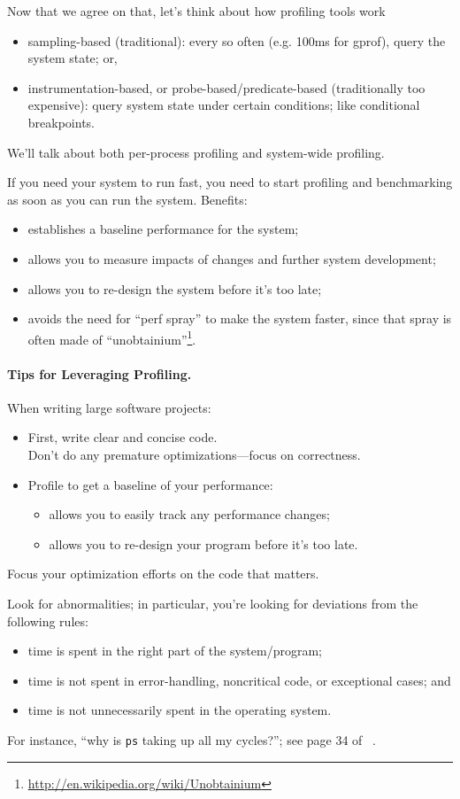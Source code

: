 \documentclass[a4paper]{report}
\begin{document}
Now that we agree on that, let's think about how profiling tools work\:

\begin{itemize}
\item sampling-based (traditional): every so often (e.g. 100ms for gprof), query the
system state; or,
\item instrumentation-based, or probe-based/predicate-based
  (traditionally too expensive): query system state under certain
  conditions; like conditional breakpoints.
\end{itemize}
We'll talk about both per-process profiling and system-wide profiling.

If you need your system to run fast, you need to start profiling
and benchmarking as soon as you can run the system. Benefits:
\begin{itemize}
\item establishes a baseline performance for the system;
\item allows you to measure impacts of changes and further system development;
\item allows you to re-design the system before it's too late;
\item avoids the need for ``perf spray'' to make the system faster, since
that spray is often made of ``unobtainium''\footnote{\url{http://en.wikipedia.org/wiki/Unobtainium}}.
\end{itemize}

\paragraph{Tips for Leveraging Profiling.}
When writing large software projects:
  \begin{itemize}
    \item First, write clear and concise code. \\
      Don't do any premature optimizations---focus on correctness.
    \item Profile to get a baseline of your performance:
      \begin{itemize}
        \item allows you to easily track any performance changes;
        \item allows you to re-design your program before it's too late.
      \end{itemize}
  \end{itemize}
Focus your optimization efforts on the code that matters.

Look for abnormalities; in particular, you're looking for
deviations from the following rules:
\begin{itemize}
\item time is spent in the right part of the system/program;
\item time is not spent in error-handling, noncritical code, or exceptional cases; and
\item time is not unnecessarily spent in the operating system.
\end{itemize}
For instance, ``why is {\tt ps} taking up all my cycles?'';
see page 34 of ~\cite{300ps}.
\end{document}
